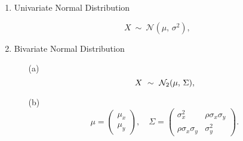 \documentclass[12pt, a4paper]{report}
\theoremstyle{plain}
\theoremstyle{definition}
\theoremstyle{remark}
\begin{document}
	\begin{enumerate}
		\item Univariate Normal Distribution
		
		\[
		X\ \sim\ \mathcal{N}(\mu,\, \sigma^2),
		\]
		
		\item Bivariate Normal Distribution
		
		\begin{itemize}
			\item[(a)] \[  X\ \sim\ \mathcal{N}_2(\mu,\, \Sigma), \vspace{1cm}\]
			\item[(b)] \[    \mu = \begin{pmatrix} \mu_x \\ \mu_y \end{pmatrix}, \quad
			\Sigma = \begin{pmatrix} \sigma_x^2 & \rho \sigma_x \sigma_y \\
			\rho \sigma_x \sigma_y  & \sigma_y^2 \end{pmatrix}.\]
		\end{itemize}
	\end{enumerate}
	
	
	







\end{document}
